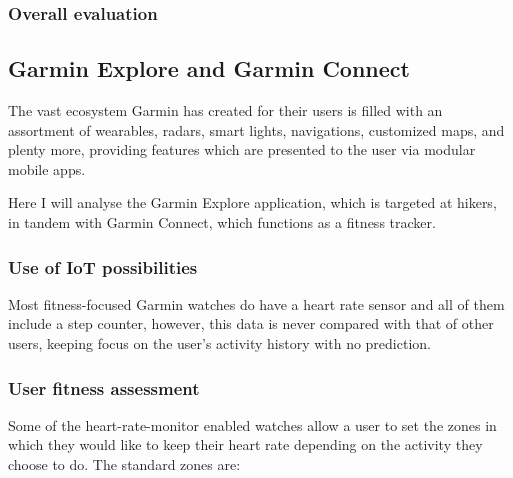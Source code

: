 \subsubsection*{Overall evaluation}
\subsection{Garmin Explore and Garmin Connect}
The vast ecosystem Garmin has created for their users is filled with an assortment of wearables, radars, smart lights, navigations, customized maps, and plenty more, providing features which are presented to the user via modular mobile apps.

Here I will analyse the Garmin Explore application, which is targeted at hikers, in tandem with Garmin Connect, which functions as a fitness tracker.

\subsubsection*{Use of IoT possibilities}
Most fitness-focused Garmin watches do have a heart rate sensor and all of them include a step counter, however, this data is never compared with that of other users, keeping focus on the user's activity history with no prediction.
\subsubsection*{User fitness assessment}
Some of the heart-rate-monitor enabled watches allow a user to set the zones in which they would like to keep their heart rate depending on the activity they choose to do. The standard zones are:


